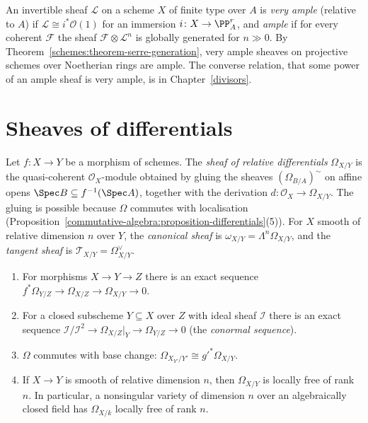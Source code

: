 \begin{definition}\label{schemes:definition-very-ample}
An invertible sheaf $\mathcal{L}$ on a scheme $X$ of finite type over $A$ is \emph{very ample} (relative to $A$) if $\mathcal{L} \cong i^*\mathcal{O}(1)$ for an
immersion $i \colon X \to \PP^r_A$, and \emph{ample} if for every coherent $\mathcal{F}$ the sheaf $\mathcal{F} \otimes \mathcal{L}^n$ is globally generated for
$n \gg 0$. By Theorem~\ref{schemes:theorem-serre-generation}, very ample sheaves on projective schemes over Noetherian rings are ample. The
converse relation, that some power of an ample sheaf is very ample, is in Chapter~\ref{divisors}.
\end{definition}

\section{Sheaves of differentials}\label{schemes:section-differentials}

\begin{definition}\label{schemes:definition-differentials}
Let $f \colon X \to Y$ be a morphism of schemes. The \emph{sheaf of relative differentials} $\Omega_{X/Y}$ is the quasi-coherent $\mathcal{O}_X$-module
obtained by gluing the sheaves $(\Omega_{B/A})^\sim$ on affine opens $\Spec B \subseteq f^{-1}(\Spec A)$, together with the derivation
$d \colon \mathcal{O}_X \to \Omega_{X/Y}$. The gluing is possible because $\Omega$ commutes with localisation
(Proposition~\ref{commutative-algebra:proposition-differentials}(5)). For $X$ smooth of relative dimension $n$ over $Y$, the \emph{canonical sheaf} is
$\omega_{X/Y} = \Lambda^n\Omega_{X/Y}$, and the \emph{tangent sheaf} is $\mathcal{T}_{X/Y} = \Omega_{X/Y}^\vee$.
\end{definition}

\begin{proposition}\label{schemes:proposition-differentials}
\begin{enumerate}
\item For morphisms $X \to Y \to Z$ there is an exact sequence $f^*\Omega_{Y/Z} \to \Omega_{X/Z} \to \Omega_{X/Y} \to 0$.
\item For a closed subscheme $Y \subseteq X$ over $Z$ with ideal sheaf $\mathcal{I}$ there is an exact sequence
$\mathcal{I}/\mathcal{I}^2 \to \Omega_{X/Z}|_Y \to \Omega_{Y/Z} \to 0$ (the \emph{conormal sequence}).
\item $\Omega$ commutes with base change: $\Omega_{X_{Y'}/Y'} \cong g'^*\Omega_{X/Y}$.
\item If $X \to Y$ is smooth of relative dimension $n$, then $\Omega_{X/Y}$ is locally free of rank $n$. In particular, a nonsingular variety of
dimension $n$ over an algebraically closed field has $\Omega_{X/k}$ locally free of rank $n$.
\end{enumerate}
\end{proposition}

